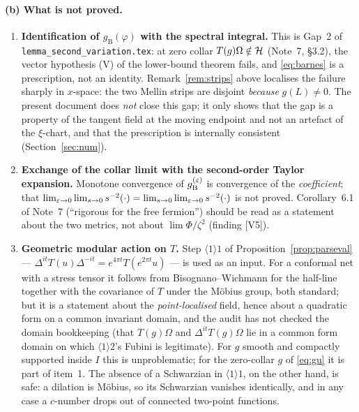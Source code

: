 \documentclass[11pt]{article}
\newcommand{\Om}{\Omega}
\newcommand{\gB}{g_{\mathrm B}}
\begin{document}
\paragraph{(b) What is not proved.}
\begin{enumerate}[leftmargin=1.6em]
\item \textbf{Identification of $\gB(\varphi)$ with the spectral integral.}  This is Gap~2 of
\texttt{lemma\_second\_variation.tex}: at zero collar $T(g)\Om\notin\cH$ (Note~7, \S3.2), the vector
hypothesis (V) of the lower-bound theorem fails, and \eqref{eq:barnes} is a prescription, not an
identity.  Remark~\ref{rem:strips} above localises the failure sharply in $x$-space: the two Mellin
strips are disjoint \emph{because} $g(L)\neq0$.  The present document does \emph{not} close this gap;
it only shows that the gap is a property of the tangent field at the moving endpoint and not an
artefact of the $\xi$-chart, and that the prescription is internally consistent
(Section~\ref{sec:num}).
\item \textbf{Exchange of the collar limit with the second-order Taylor expansion.}  Monotone
convergence of $\gB^{(\eps)}$ is convergence of the \emph{coefficient}; that
$\lim_{\varepsilon\to0}\lim_{s\to0}s^{-2}(\cdot)=\lim_{s\to0}\lim_{\varepsilon\to0}s^{-2}(\cdot)$ is not proved.
Corollary~6.1 of Note~7 (``rigorous for the free fermion'') should be read as a statement about the
two metrics, not about $\lim\Phi/\zeta^2$ (finding [V5]).
\item \textbf{Geometric modular action on $T$.}  Step $\langle1\rangle1$ of
Proposition~\ref{prop:parseval} --- $\Delta^{it}T(u)\Delta^{-it}=e^{4\pi t}T(e^{2\pi t}u)$ --- is used
as an input.  For a conformal net with a stress tensor it follows from Bisognano--Wichmann for the
half-line together with the covariance of $T$ under the M\"obius group, both standard; but it is a
statement about the \emph{point-localised} field, hence about a quadratic form on a common invariant
domain, and the audit has not checked the domain bookkeeping (that $T(g)\Om$ and $\Delta^{it}T(g)\Om$
lie in a common form domain on which $\langle1\rangle2$'s Fubini is legitimate).  For $g$ smooth and
compactly supported inside $I$ this is unproblematic; for the zero-collar $g$ of \eqref{eq:gu} it is
part of item~1.  The absence of a Schwarzian in $\langle1\rangle1$, on the other hand, is safe: a
dilation is M\"obius, so its Schwarzian vanishes identically, and in any case a $c$-number drops out of
connected two-point functions.
\end{enumerate}
\end{document}
